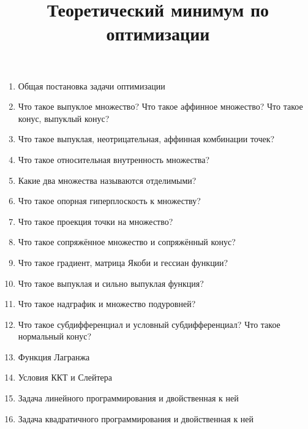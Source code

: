 \documentclass[12pt]{article}
\begin{document}
\title{Теоретический минимум по оптимизации}
\author{}
\date{}

\maketitle
\thispagestyle{empty}
\vspace{-2cm}
\begin{enumerate}
\item Общая постановка задачи оптимизации
\item Что такое выпуклое множество? Что такое аффинное множество? Что такое конус, выпуклый конус?
\item Что такое выпуклая, неотрицательная, аффинная комбинации точек?
\item Что такое относительная внутренность множества?
\item Какие два множества называются отделимыми?
\item Что такое опорная гиперплоскость к множеству?
\item Что такое проекция точки на множество?
\item Что такое сопряжённое множество и сопряжённый конус?
\item Что такое градиент, матрица Якоби и гессиан функции?
\item Что такое выпуклая и сильно выпуклая функция?
\item Что такое надграфик и множество подуровней?
\item Что такое субдифференциал и условный субдифференциал? Что такое нормальный конус?
\item Функция Лагранжа
\item Условия ККТ и Слейтера
\item Задача линейного программирования и двойственная к ней
\item Задача квадратичного программирования и двойственная к ней

\end{enumerate}
\end{document}

